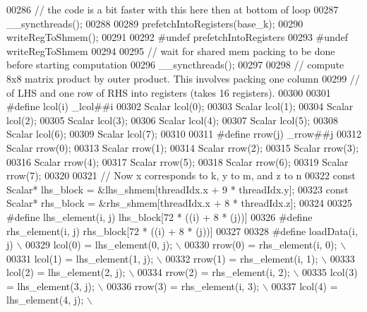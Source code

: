 \begin{DoxyCode}
00286     \textcolor{comment}{// the code is a bit faster with this here then at bottom of loop}
00287     \_\_syncthreads();
00288 
00289     prefetchIntoRegisters(base\_k);
00290     writeRegToShmem();
00291 
00292 \textcolor{preprocessor}{    #undef prefetchIntoRegisters}
00293 \textcolor{preprocessor}{    #undef writeRegToShmem}
00294 
00295     \textcolor{comment}{// wait for shared mem packing to be done before starting computation}
00296     \_\_syncthreads();
00297 
00298     \textcolor{comment}{// compute 8x8 matrix product by outer product. This involves packing one column}
00299     \textcolor{comment}{// of LHS and one row of RHS into registers (takes 16 registers).}
00300 
00301 \textcolor{preprocessor}{#define lcol(i) \_lcol##i}
00302     Scalar lcol(0);
00303     Scalar lcol(1);
00304     Scalar lcol(2);
00305     Scalar lcol(3);
00306     Scalar lcol(4);
00307     Scalar lcol(5);
00308     Scalar lcol(6);
00309     Scalar lcol(7);
00310 
00311 \textcolor{preprocessor}{#define rrow(j) \_rrow##j}
00312     Scalar rrow(0);
00313     Scalar rrow(1);
00314     Scalar rrow(2);
00315     Scalar rrow(3);
00316     Scalar rrow(4);
00317     Scalar rrow(5);
00318     Scalar rrow(6);
00319     Scalar rrow(7);
00320 
00321     \textcolor{comment}{// Now x corresponds to k, y to m, and z to n}
00322     \textcolor{keyword}{const} Scalar* lhs\_block = &lhs\_shmem[threadIdx.x + 9 * threadIdx.y];
00323     \textcolor{keyword}{const} Scalar* rhs\_block = &rhs\_shmem[threadIdx.x + 8 * threadIdx.z];
00324 
00325 \textcolor{preprocessor}{#define lhs\_element(i, j) lhs\_block[72 * ((i) + 8 * (j))]}
00326 \textcolor{preprocessor}{#define rhs\_element(i, j) rhs\_block[72 * ((i) + 8 * (j))]}
00327 
00328 \textcolor{preprocessor}{#define loadData(i, j)                          \(\backslash\)}
00329 \textcolor{preprocessor}{    lcol(0) = lhs\_element(0, j);               \(\backslash\)}
00330 \textcolor{preprocessor}{    rrow(0) = rhs\_element(i, 0);               \(\backslash\)}
00331 \textcolor{preprocessor}{    lcol(1) = lhs\_element(1, j);               \(\backslash\)}
00332 \textcolor{preprocessor}{    rrow(1) = rhs\_element(i, 1);               \(\backslash\)}
00333 \textcolor{preprocessor}{    lcol(2) = lhs\_element(2, j);               \(\backslash\)}
00334 \textcolor{preprocessor}{    rrow(2) = rhs\_element(i, 2);               \(\backslash\)}
00335 \textcolor{preprocessor}{    lcol(3) = lhs\_element(3, j);               \(\backslash\)}
00336 \textcolor{preprocessor}{    rrow(3) = rhs\_element(i, 3);               \(\backslash\)}
00337 \textcolor{preprocessor}{    lcol(4) = lhs\_element(4, j);               \(\backslash\)}

\end{DoxyCode}
